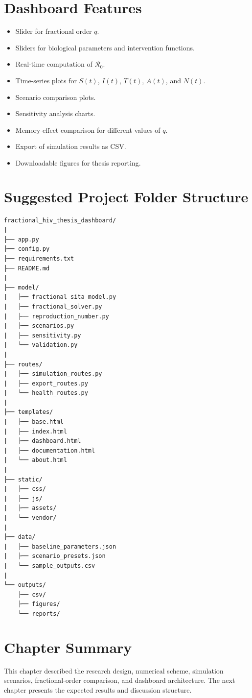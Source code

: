 \documentclass[12pt,a4paper,oneside]{report}
\newcommand{\Rzero}{\mathcal{R}_0}
\begin{document}
\section{Dashboard Features}
\begin{itemize}
  \item Slider for fractional order $q$.
  \item Sliders for biological parameters and intervention functions.
  \item Real-time computation of $\Rzero$.
  \item Time-series plots for $S(t)$, $I(t)$, $T(t)$, $A(t)$, and $N(t)$.
  \item Scenario comparison plots.
  \item Sensitivity analysis charts.
  \item Memory-effect comparison for different values of $q$.
  \item Export of simulation results as CSV.
  \item Downloadable figures for thesis reporting.
\end{itemize}

\section{Suggested Project Folder Structure}
\begin{lstlisting}[style=pythonstyle]
fractional_hiv_thesis_dashboard/
|
├── app.py
├── config.py
├── requirements.txt
├── README.md
|
├── model/
|   ├── fractional_sita_model.py
|   ├── fractional_solver.py
|   ├── reproduction_number.py
|   ├── scenarios.py
|   ├── sensitivity.py
|   └── validation.py
|
├── routes/
|   ├── simulation_routes.py
|   ├── export_routes.py
|   └── health_routes.py
|
├── templates/
|   ├── base.html
|   ├── index.html
|   ├── dashboard.html
|   ├── documentation.html
|   └── about.html
|
├── static/
|   ├── css/
|   ├── js/
|   ├── assets/
|   └── vendor/
|
├── data/
|   ├── baseline_parameters.json
|   ├── scenario_presets.json
|   └── sample_outputs.csv
|
└── outputs/
    ├── csv/
    ├── figures/
    └── reports/
\end{lstlisting}

\section{Chapter Summary}
This chapter described the research design, numerical scheme, simulation scenarios, fractional-order comparison, and dashboard architecture. The next chapter presents the expected results and discussion structure.
\end{document}
